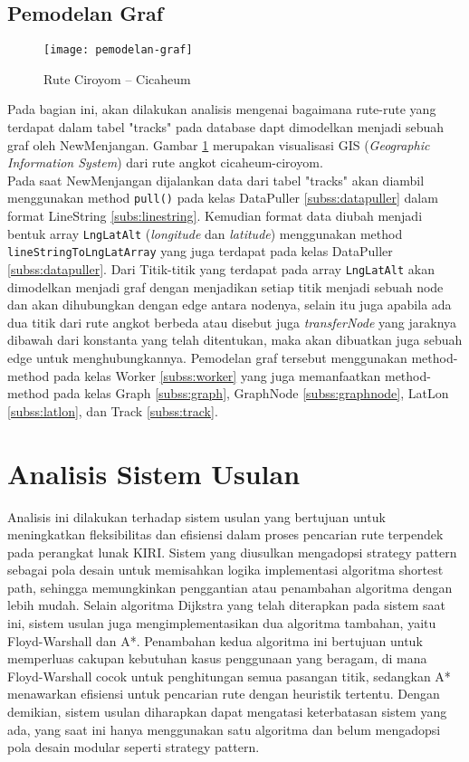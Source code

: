 \subsection{Pemodelan Graf}
\begin{figure}[h] 
    \centering  
    \texttt{[image: pemodelan-graf]}  
    \caption{Rute Ciroyom – Cicaheum}
    \label{fig:pemodelangraf} 
\end{figure}
\noindent
Pada bagian ini, akan dilakukan analisis mengenai bagaimana rute-rute yang terdapat dalam tabel "tracks" pada database dapt dimodelkan menjadi sebuah graf oleh NewMenjangan. Gambar \ref{fig:pemodelangraf} merupakan visualisasi GIS (\textit{Geographic Information System}) dari rute angkot cicaheum-ciroyom.
\\
Pada saat NewMenjangan dijalankan data dari tabel "tracks" akan diambil menggunakan method \texttt{pull()} pada kelas DataPuller \ref{subss:datapuller} dalam format LineString \ref{subs:linestring}. Kemudian format data diubah menjadi bentuk array \texttt{LngLatAlt} (\textit{longitude} dan \textit{latitude}) menggunakan method \texttt{lineStringToLngLatArray} yang juga terdapat pada kelas DataPuller \ref{subss:datapuller}. Dari Titik-titik yang terdapat pada array \texttt{LngLatAlt} akan dimodelkan menjadi graf dengan menjadikan setiap titik menjadi sebuah node dan akan dihubungkan dengan edge antara nodenya, selain itu juga apabila ada dua titik dari rute angkot berbeda atau disebut juga \textit{transferNode} yang jaraknya dibawah dari konstanta yang telah ditentukan, maka akan dibuatkan juga sebuah edge untuk menghubungkannya. Pemodelan graf tersebut menggunakan method-method pada kelas Worker \ref{subss:worker} yang juga memanfaatkan method-method pada kelas Graph \ref{subss:graph}, GraphNode \ref{subss:graphnode}, LatLon \ref{subss:latlon}, dan Track \ref{subss:track}.

\section{Analisis Sistem Usulan}
Analisis ini dilakukan terhadap sistem usulan yang bertujuan untuk meningkatkan fleksibilitas dan efisiensi dalam proses pencarian rute terpendek pada perangkat lunak KIRI. Sistem yang diusulkan mengadopsi strategy pattern sebagai pola desain untuk memisahkan logika implementasi algoritma shortest path, sehingga memungkinkan penggantian atau penambahan algoritma dengan lebih mudah. Selain algoritma Dijkstra yang telah diterapkan pada sistem saat ini, sistem usulan juga mengimplementasikan dua algoritma tambahan, yaitu Floyd-Warshall dan A*. Penambahan kedua algoritma ini bertujuan untuk memperluas cakupan kebutuhan kasus penggunaan yang beragam, di mana Floyd-Warshall cocok untuk penghitungan semua pasangan titik, sedangkan A* menawarkan efisiensi untuk pencarian rute dengan heuristik tertentu. Dengan demikian, sistem usulan diharapkan dapat mengatasi keterbatasan sistem yang ada, yang saat ini hanya menggunakan satu algoritma dan belum mengadopsi pola desain modular seperti strategy pattern.

